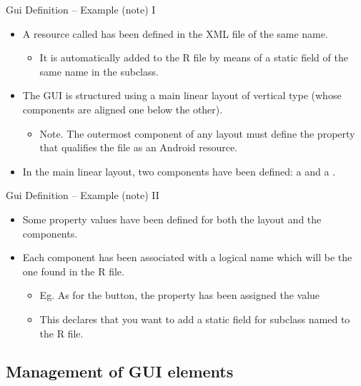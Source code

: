 \documentclass{beamer}
\begin{document}
  \begin{frame}{Gui Definition -- Example (note) I}
    \begin{itemize}
      \item A resource called  has been defined in the
      XML file of the same name.
      \begin{itemize} 
        \item It is automatically added to the R file by means of a static field
        of the same name in the  subclass. 
      \end{itemize}
      \item The GUI is structured using a main linear layout of vertical type
      (whose components are aligned one below the other).
      \begin{itemize}
        \item Note. The outermost component of any layout must define the
        property that qualifies the file as an Android resource.
      \end{itemize}
      \item In the main linear layout, two components have been defined: a
       and a .
    \end{itemize}
  \end{frame}
  \begin{frame}{Gui Definition -- Example (note) II}
    \begin{itemize}
      \item Some property values have been defined for both the layout and the
      components.
      \item Each component has been associated with a logical name which will be
      the one found in the R file. 
      \begin{itemize}
        \item Eg. As for the button, the  property has been
        assigned the value 
        \item This declares that you want to add a static field for subclass
         named  to the R file.
      \end{itemize}
    \end{itemize}
  \end{frame}

\subsection{Management of GUI elements}
\end{document}
